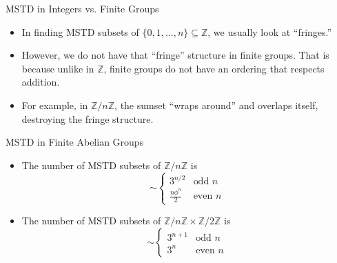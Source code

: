 \documentclass{beamer}
\newcommand{\bi}{\begin{itemize}}
\newcommand{\ei}{\end{itemize}}
\newcommand{\Z}{\mathbb{Z}}
\newcommand{\znz}{\Z / n \Z}
\begin{document}
\begin{frame}{MSTD in Integers vs. Finite Groups}
\begin{itemize}
	\item In finding MSTD subsets of $\{0, 1, \dots, n\}\subseteq \Z$, we usually look at ``fringes.''
		\pause
		\medskip
		\begin{center}
		\end{center}
		\pause
		\bigskip
	\item However, we do not have that ``fringe'' structure in finite groups. That is because unlike in $\Z$, finite groups do not have an ordering that respects addition.
		\pause
		\bigskip
	\item For example, in $\znz$, the sumset ``wraps around'' and overlaps itself, destroying the fringe structure.
\end{itemize}
\end{frame}

\begin{frame}{MSTD in Finite Abelian Groups}
\begin{theorem}[Zhao]
\bi 
	\item The number of MSTD subsets of $\znz$ is
		\[
		\sim \begin{cases}
			3^{n/2} & \text{odd $n$}\\
			\frac{n\phi^{n}}{2} & \text{even $n$}
		\end{cases}
		\]
		\pause
	\item The number of MSTD subsets of $\znz \times \Z/2\Z$ is
		\[
		\sim \begin{cases}
			3^{n+1} & \text{odd $n$}\\
			3^n & \text{even $n$}
		\end{cases}
		\]
\ei
\end{theorem}
\end{frame}
\end{document}
